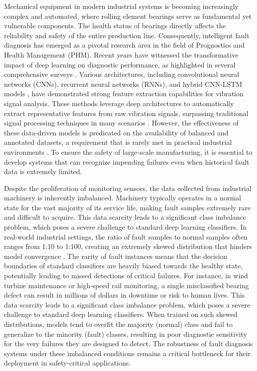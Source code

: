 \documentclass[twocolumn]{IEEEtran}
\begin{document}
Mechanical equipment in modern industrial systems is becoming increasingly complex and automated, where rolling element bearings serve as fundamental yet vulnerable components. The health status of bearings directly affects the reliability and safety of the entire production line. Consequently, intelligent fault diagnosis has emerged as a pivotal research area in the field of Prognostics and Health Management (PHM). Recent years have witnessed the transformative impact of deep learning on diagnostic performance, as highlighted in several comprehensive surveys \cite{8, Lei2020, 9}. Various architectures, including convolutional neural networks (CNNs), recurrent neural networks (RNNs), and hybrid CNN-LSTM models \cite{10}, have demonstrated strong feature extraction capabilities for vibration signal analysis. These methods leverage deep architectures to automatically extract representative features from raw vibration signals, surpassing traditional signal processing techniques in many scenarios \cite{32}. However, the effectiveness of these data-driven models is predicated on the availability of balanced and annotated datasets, a requirement that is rarely met in practical industrial environments \cite{40, 41}. To ensure the safety of large-scale manufacturing, it is essential to develop systems that can recognize impending failures even when historical fault data is extremely limited.

Despite the proliferation of monitoring sensors, the data collected from industrial machinery is inherently imbalanced. Machinery typically operates in a normal state for the vast majority of its service life, making fault samples extremely rare and difficult to acquire. This data scarcity leads to a significant class imbalance problem, which poses a severe challenge to standard deep learning classifiers. In real-world industrial settings, the ratio of fault samples to normal samples often ranges from 1:10 to 1:100, creating an extremely skewed distribution that hinders model convergence \cite{32, 40}. The rarity of fault instances means that the decision boundaries of standard classifiers are heavily biased towards the healthy state, potentially leading to missed detections of critical failures. For instance, in wind turbine maintenance or high-speed rail monitoring, a single misclassified bearing defect can result in millions of dollars in downtime or risk to human lives. This data scarcity leads to a significant class imbalance problem, which poses a severe challenge to standard deep learning classifiers. When trained on such skewed distributions, models tend to overfit the majority (normal) class and fail to generalize to the minority (fault) classes, resulting in poor diagnostic sensitivity for the very failures they are designed to detect. The robustness of fault diagnosis systems under these imbalanced conditions remains a critical bottleneck for their deployment in safety-critical applications.
\end{document}
